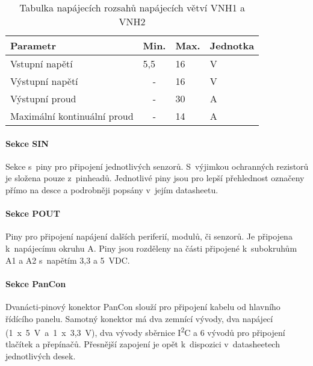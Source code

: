 \begin{table}[h]
    \centering
    \begin{tabular}{llll}
        \hline
        \multicolumn{1}{|l|}{\textbf{Parametr}}           & \multicolumn{1}{l|}{\textbf{Min.}} & \multicolumn{1}{l|}{\textbf{Max.}} & \multicolumn{1}{l|}{\textbf{Jednotka}} \\ \hline
        \multicolumn{1}{|l|}{Vstupní napětí}              & \multicolumn{1}{l|}{5,5}           & \multicolumn{1}{l|}{16}            & \multicolumn{1}{l|}{V}                 \\ \hline
        \multicolumn{1}{|l|}{Výstupní napětí}             & \multicolumn{1}{c|}{-}             & \multicolumn{1}{l|}{16}            & \multicolumn{1}{l|}{V}                 \\ \hline
        \multicolumn{1}{|l|}{Výstupní proud}              & \multicolumn{1}{c|}{-}             & \multicolumn{1}{l|}{30}            & \multicolumn{1}{l|}{A}                 \\ \hline
        \multicolumn{1}{|l|}{Maximální kontinuální proud} & \multicolumn{1}{c|}{-}             & \multicolumn{1}{l|}{14}            & \multicolumn{1}{l|}{A}                 \\ \hline
    \end{tabular}
    \caption{Tabulka napájecích rozsahů napájecích větví VNH1 a VNH2}
    \label{fig:powerSourceCharsVNH}
\end{table}

\paragraph{Sekce SIN}
Sekce s~piny pro připojení jednotlivých senzorů. 
S~výjimkou ochranných rezistorů je složena pouze z~pinheadů.
Jednotlivé piny jsou pro lepší přehlednost označeny přímo na desce a podrobněji popsány v~jejím datasheetu. 

\paragraph{Sekce POUT} 
Piny pro připojení napájení dalších periferií, modulů, či senzorů.
Je připojena k~napájecímu okruhu A.
Piny jsou rozděleny na části připojené k~subokruhům A1 a A2 s~napětím 3,3 a 5~VDC.

\paragraph{Sekce PanCon}
Dvanácti-pinový konektor PanCon slouží pro připojení kabelu od hlavního řídícího panelu. 
Samotný konektor má dva zemnící vývody, dva napájecí (1~x~5~V~a~1~x~3,3~V), dva vývody sběrnice I\textsuperscript{2}C a 6 vývodů pro připojení tlačítek a přepínačů.
Přesnější zapojení je opět k~dispozici v~datasheetech jednotlivých desek.

